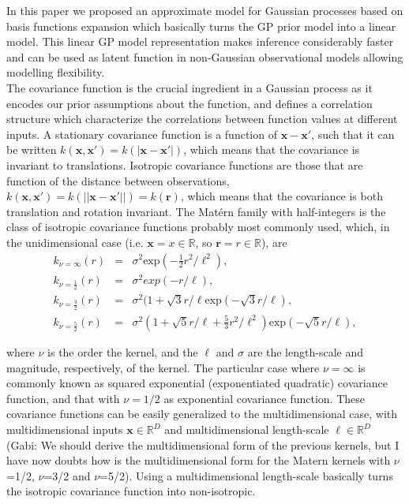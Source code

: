 \documentclass[]{interact}
\theoremstyle{plain}%
\theoremstyle{definition}
\theoremstyle{remark}
\begin{document}
In this paper we proposed an approximate model for Gaussian processes based on basis functions expansion which basically turns the GP prior model into a linear model. This linear GP model representation makes inference considerably faster and can be used as latent function in non-Gaussian observational models allowing modelling flexibility.\\

The covariance function is the crucial ingredient in a Gaussian process as it encodes our prior assumptions about the function, and defines a correlation structure which characterize the correlations between function values at different inputs. A stationary covariance function is a function of $\mathbf{x}-\mathbf{x}'$, such that it can be written $k(\mathbf{x},\mathbf{x}') = k(|\mathbf{x}-\mathbf{x}'|)$, which means that the covariance is invariant to translations. Isotropic covariance functions are those that are function of the distance between observations, $k(\mathbf{x},\mathbf{x}') = k(||\mathbf{x}-\mathbf{x}'||) = k(\mathbf{r})$, which means that the covariance is both translation and rotation invariant. The Mat\'ern family with half-integers is the class of isotropic covariance functions probably most commonly used, which, in the unidimensional case (i.e. $\mathbf{x}=x\in \mathbb{R}$, so $\mathbf{r}=r\in \mathbb{R}$), are
%
\begin{eqnarray}
k_{\nu=\infty}(r)&=&\sigma^2 \text{exp}(-\frac{1}{2} r^2/\ell^2), \nonumber \\
k_{\nu=\frac{1}{2}}(r)&=&\sigma^2 exp(-r/\ell), \nonumber \\
k_{\nu=\frac{3}{2}}(r)&=&\sigma^2(1+\sqrt{3}r/\ell \text{exp}(-\sqrt{3}r/\ell), \nonumber \\
k_{\nu=\frac{5}{2}}(r)&=&\sigma^2(1+\sqrt{5}r/\ell+\frac{5}{3}r^2/\ell^2) \text{exp}(-\sqrt{5}r/\ell), \nonumber 
\end{eqnarray}

\noindent where $\nu$ is the order the kernel, and the $\ell$ and $\sigma$ are the length-scale and magnitude, respectively, of the kernel. The particular case where $\nu=\infty$ is commonly known as squared exponential (exponentiated quadratic) covariance function, and that with $\nu=1/2$ as exponential covariance function. These covariance functions can be easily generalized to the multidimensional case, with multidimensional inputs $\mathbf{x}\in \mathbb{R}^D$ and multidimensional length-scale $\boldsymbol{\ell}\in \mathbb{R}^D$ (Gabi: We should derive the multidimensional form of the previous kernels, but I have now doubts how is the multidimensional form for the Matern kernels with $\nu$=1/2, $\nu$=3/2 and $\nu$=5/2). Using a multidimensional length-scale basically turns the isotropic covariance function into non-isotropic. 
\end{document}
